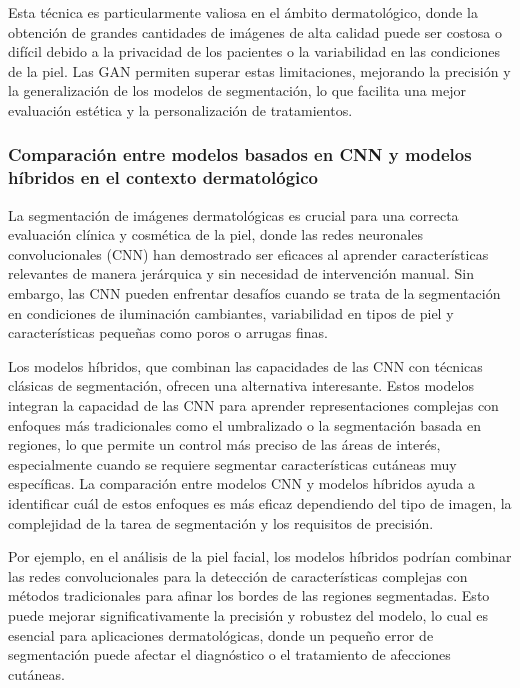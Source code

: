 Esta técnica es particularmente valiosa en el ámbito dermatológico, donde la obtención de grandes cantidades de imágenes de alta calidad puede ser costosa o difícil debido a la privacidad de los pacientes o la variabilidad en las condiciones de la piel. Las GAN permiten superar estas limitaciones, mejorando la precisión y la generalización de los modelos de segmentación, lo que facilita una mejor evaluación estética y la personalización de tratamientos. \parencite{goodfellow2014}
%
\subsubsection{Comparación entre modelos basados en CNN y modelos híbridos en el contexto dermatológico}
La segmentación de imágenes dermatológicas es crucial para una correcta evaluación clínica y cosmética de la piel, donde las redes neuronales convolucionales (CNN) han demostrado ser eficaces al aprender características relevantes de manera jerárquica y sin necesidad de intervención manual. Sin embargo, las CNN pueden enfrentar desafíos cuando se trata de la segmentación en condiciones de iluminación cambiantes, variabilidad en tipos de piel y características pequeñas como poros o arrugas finas.

Los modelos híbridos, que combinan las capacidades de las CNN con técnicas clásicas de segmentación, ofrecen una alternativa interesante. Estos modelos integran la capacidad de las CNN para aprender representaciones complejas con enfoques más tradicionales como el umbralizado o la segmentación basada en regiones, lo que permite un control más preciso de las áreas de interés, especialmente cuando se requiere segmentar características cutáneas muy específicas. La comparación entre modelos CNN y modelos híbridos ayuda a identificar cuál de estos enfoques es más eficaz dependiendo del tipo de imagen, la complejidad de la tarea de segmentación y los requisitos de precisión.

Por ejemplo, en el análisis de la piel facial, los modelos híbridos podrían combinar las redes convolucionales para la detección de características complejas con métodos tradicionales para afinar los bordes de las regiones segmentadas. Esto puede mejorar significativamente la precisión y robustez del modelo, lo cual es esencial para aplicaciones dermatológicas, donde un pequeño error de segmentación puede afectar el diagnóstico o el tratamiento de afecciones cutáneas. \parencite{hussain2021}

